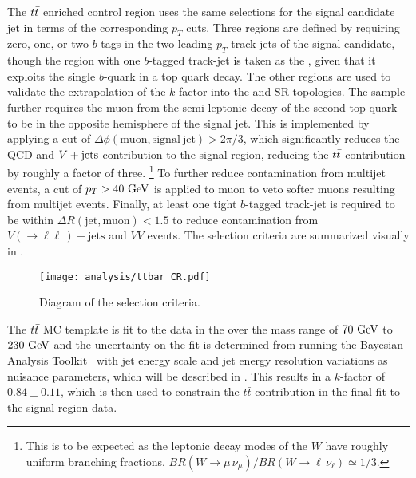 The $t\bar{t}$ enriched control region uses the same selections for the signal candidate \largeR{} jet in terms of the corresponding $p_{T}$ cuts.
Three regions are defined by requiring zero, one, or two $b$-tags in the two leading $p_{T}$ track-jets of the signal candidate, though the region with one $b$-tagged track-jet is taken as the \CRttbar{}, given that it exploits the single $b$-quark in a top quark decay.
The other regions are used to validate the extrapolation of the $k$-factor into the \CRQCD{} and SR topologies.
The sample further requires the muon from the semi-leptonic decay of the second top quark to be in the opposite hemisphere of the signal jet.
This is implemented by applying a cut of $\Delta \phi \left(\mathrm{muon}, \mathrm{signal~jet}\right) > 2\pi/3$, which significantly reduces the QCD and $V + \text{jets}$ contribution to the signal region, reducing the $t\bar{t}$ contribution by roughly a factor of three.%
\footnote{This is to be expected as the leptonic decay modes of the $W$ have roughly uniform branching fractions, $BR\left(W \to \mu\, \nu_{\mu}\right)/BR\left(W \to \ell \,\nu_{\ell}\right) \simeq 1/3$.}
To further reduce contamination from multijet events, a cut of $p_{T} > 40~\mathrm{GeV}$ is applied to muon to veto softer muons resulting from multijet events.
Finally, at least one tight $b$-tagged track-jet is required to be within $\Delta R \left(\mathrm{jet}, \mathrm{muon}\right) < 1.5$ to reduce contamination from $V\left(\to \ell\ell\,\right)+\mathrm{jets}$ and $VV$ events.
The \CRttbar{} selection criteria are summarized visually in .

\begin{figure}[htbp]
 \centering
 \texttt{[image: analysis/ttbar\_CR.pdf]}
 \caption[Diagram of the $t\bar{t}$ control region selection criteria.]{%
  Diagram of the \CRttbar{} selection criteria.}
 \label{fig:ttbar_CR_selection}
\end{figure}

The $t\bar{t}$ MC template is fit to the data in the \CRttbar{} over the mass range of $70~\mathrm{GeV}$ to $230~\mathrm{GeV}$ and the uncertainty on the fit is determined from running the Bayesian Analysis Toolkit~\cite{Beaujean:2011zz} with \largeR{} jet energy scale and jet energy resolution variations as nuisance parameters, which will be described in .
This results in a $k$-factor of $0.84 \pm 0.11$, which is then used to constrain the $t\bar{t}$ contribution in the final fit to the signal region data.


